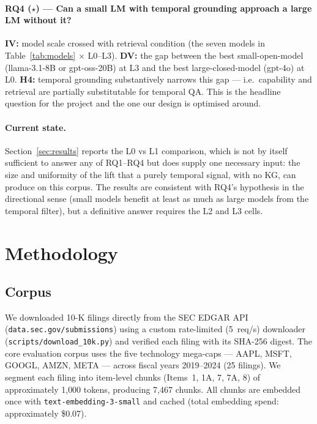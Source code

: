 \documentclass[11pt]{article}
\begin{document}
\paragraph{RQ4 ($\star$) --- Can a small LM with temporal grounding
approach a large LM without it?}
\textbf{IV:} model scale crossed with retrieval condition (the seven
models in Table~\ref{tab:models} $\times$ L0--L3). \textbf{DV:} the
gap between the best small-open-model (llama-3.1-8B or gpt-oss-20B) at
L3 and the best large-closed-model (gpt-4o) at L0. \textbf{H4:} temporal
grounding substantively narrows this gap --- i.e.\ capability and
retrieval are partially substitutable for temporal QA. This is the
headline question for the project and the one our design is optimised
around.

\paragraph{Current state.} Section~\ref{sec:results} reports the
L0 vs L1 comparison, which is not by itself sufficient to answer any of
RQ1--RQ4 but does supply one necessary input: the size and uniformity
of the lift that a purely temporal signal, with no KG, can produce on
this corpus. The results are consistent with RQ4's hypothesis in the
directional sense (small models benefit at least as much as large
models from the temporal filter), but a definitive answer requires the
L2 and L3 cells.

\section{Methodology}
\label{sec:method}

\subsection{Corpus}
\label{sec:corpus}
We downloaded 10-K filings directly from the SEC EDGAR API
(\texttt{data.sec.gov/submissions}) using a custom rate-limited
(5~req/s) downloader (\texttt{scripts/download\_10k.py}) and verified
each filing with its SHA-256 digest. The core evaluation corpus uses
the five technology mega-caps --- AAPL, MSFT, GOOGL, AMZN, META ---
across fiscal years 2019--2024 (25 filings). We segment each filing
into item-level chunks (Items~1, 1A, 7, 7A, 8) of approximately 1{,}000
tokens, producing 7{,}467 chunks. All chunks are embedded once with
\texttt{text-embedding-3-small} and cached
(total embedding spend: approximately \$0.07).
\end{document}
